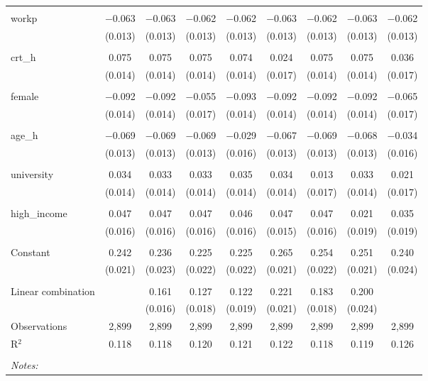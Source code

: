 \begin{table}[!htbp]
\begin{tabular}{@{\extracolsep{5pt}}lcccccccc}
  & & & & & & & & \\ 
 workp & $-$0.063 & $-$0.063 & $-$0.062 & $-$0.062 & $-$0.063 & $-$0.062 & $-$0.063 & $-$0.062 \\ 
  & (0.013) & (0.013) & (0.013) & (0.013) & (0.013) & (0.013) & (0.013) & (0.013) \\ 
  & & & & & & & & \\ 
 crt\_h & 0.075 & 0.075 & 0.075 & 0.074 & 0.024 & 0.075 & 0.075 & 0.036 \\ 
  & (0.014) & (0.014) & (0.014) & (0.014) & (0.017) & (0.014) & (0.014) & (0.017) \\ 
  & & & & & & & & \\ 
 female & $-$0.092 & $-$0.092 & $-$0.055 & $-$0.093 & $-$0.092 & $-$0.092 & $-$0.092 & $-$0.065 \\ 
  & (0.014) & (0.014) & (0.017) & (0.014) & (0.014) & (0.014) & (0.014) & (0.017) \\ 
  & & & & & & & & \\ 
 age\_h & $-$0.069 & $-$0.069 & $-$0.069 & $-$0.029 & $-$0.067 & $-$0.069 & $-$0.068 & $-$0.034 \\ 
  & (0.013) & (0.013) & (0.013) & (0.016) & (0.013) & (0.013) & (0.013) & (0.016) \\ 
  & & & & & & & & \\ 
 university & 0.034 & 0.033 & 0.033 & 0.035 & 0.034 & 0.013 & 0.033 & 0.021 \\ 
  & (0.014) & (0.014) & (0.014) & (0.014) & (0.014) & (0.017) & (0.014) & (0.017) \\ 
  & & & & & & & & \\ 
 high\_income & 0.047 & 0.047 & 0.047 & 0.046 & 0.047 & 0.047 & 0.021 & 0.035 \\ 
  & (0.016) & (0.016) & (0.016) & (0.016) & (0.015) & (0.016) & (0.019) & (0.019) \\ 
  & & & & & & & & \\ 
 Constant & 0.242 & 0.236 & 0.225 & 0.225 & 0.265 & 0.254 & 0.251 & 0.240 \\ 
  & (0.021) & (0.023) & (0.022) & (0.022) & (0.021) & (0.022) & (0.021) & (0.024) \\ 
  & & & & & & & & \\ 
Linear combination &   & 0.161 & 0.127 & 0.122 & 0.221 & 0.183 & 0.200 &  \\ 
 &  & (0.016) & (0.018) & (0.019) & (0.021) & (0.018) & (0.024) &  \\ 
Observations & 2,899 & 2,899 & 2,899 & 2,899 & 2,899 & 2,899 & 2,899 & 2,899 \\ 
R$^{2}$ & 0.118 & 0.118 & 0.120 & 0.121 & 0.122 & 0.118 & 0.119 & 0.126 \\ 
\hline \\[-1.8ex] 
\textit{Notes:} & \multicolumn{8}{l}{} \\ 
\end{tabular} 
\end{table} 
